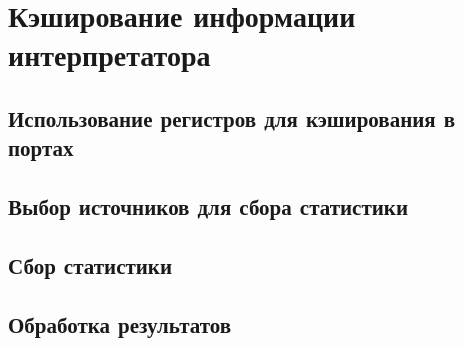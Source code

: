 \section{Кэширование информации интерпретатора}

\subsection{Использование регистров для кэширования в портах}

\subsection{Выбор источников для сбора статистики}

\subsection{Сбор статистики}

\subsection{Обработка результатов}
